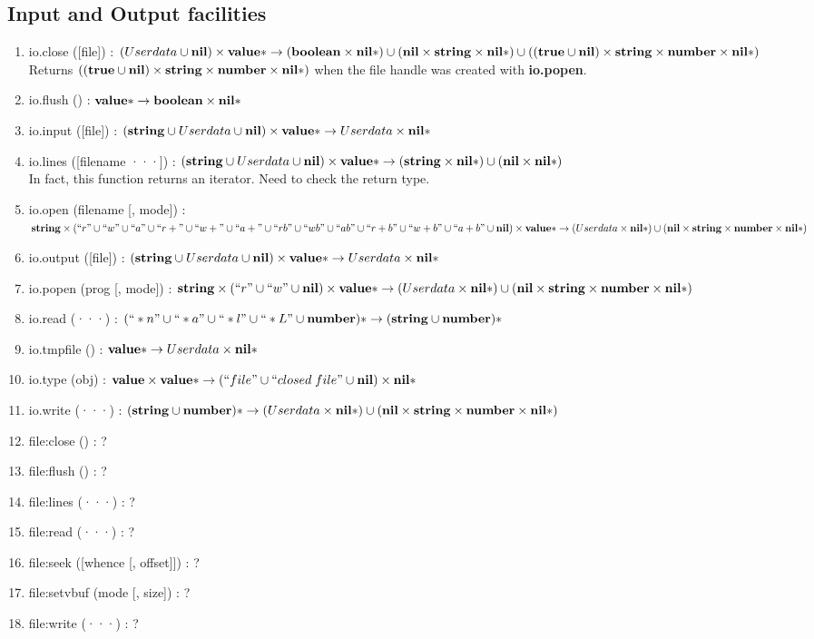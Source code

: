 \subsection{Input and Output facilities}

\begin{enumerate}
\item io.close ([file]) :
$(Userdata \cup \mathbf{nil}) \times
\mathbf{value}{*} \rightarrow
(\mathbf{boolean} \times \mathbf{nil}{*}) \cup
(\mathbf{nil} \times \mathbf{string} \times \mathbf{nil}{*}) \cup
((\mathbf{true} \cup \mathbf{nil}) \times \mathbf{string} \times \mathbf{number} \times \mathbf{nil}{*})$
\\
Returns $((\mathbf{true} \cup \mathbf{nil}) \times \mathbf{string} \times \mathbf{number} \times \mathbf{nil}{*})$
when the file handle was created with \textbf{io.popen}.
\item io.flush () :
$\mathbf{value}{*} \rightarrow \mathbf{boolean} \times \mathbf{nil}{*}$
\item io.input ([file]) :
$(\mathbf{string} \cup Userdata \cup \mathbf{nil}) \times
\mathbf{value}{*} \rightarrow
Userdata \times
\mathbf{nil}{*}$
\item io.lines ([filename ···]) :
$(\mathbf{string} \cup Userdata \cup \mathbf{nil}) \times
\mathbf{value}{*} \rightarrow
(\mathbf{string} \times \mathbf{nil}{*}) \cup
(\mathbf{nil} \times \mathbf{nil}{*})$
\\
In fact, this function returns an iterator. Need to check the return type.
\item io.open (filename [, mode]) :
$\mathbf{string} \times
(``r" \cup ``w" \cup ``a" \cup
``r+" \cup ``w+" \cup ``a+" \cup
``rb" \cup ``wb" \cup ``ab" \cup
``r+b" \cup ``w+b" \cup ``a+b" \cup
\mathbf{nil}) \times
\mathbf{value}{*} \rightarrow
(Userdata \times \mathbf{nil}{*}) \cup
(\mathbf{nil} \times \mathbf{string} \times \mathbf{number} \times \mathbf{nil}{*})$
\item io.output ([file]) :
$(\mathbf{string} \cup Userdata \cup \mathbf{nil}) \times
\mathbf{value}{*} \rightarrow
Userdata \times
\mathbf{nil}{*}$
\item io.popen (prog [, mode]) :
$\mathbf{string} \times
(``r" \cup ``w" \cup \mathbf{nil}) \times
\mathbf{value}{*} \rightarrow
(Userdata \times \mathbf{nil}{*}) \cup
(\mathbf{nil} \times \mathbf{string} \times \mathbf{number} \times \mathbf{nil}{*})$
\item io.read (···) :
$(``*n" \cup ``*a" \cup ``*l" \cup ``*L" \cup \mathbf{number}){*} \rightarrow
(\mathbf{string} \cup \mathbf{number}){*}
$
\item io.tmpfile () :
$\mathbf{value}{*} \rightarrow Userdata \times \mathbf{nil}{*}$
\item io.type (obj) :
$\mathbf{value} \times \mathbf{value}{*} \rightarrow (``file" \cup ``closed\;file" \cup \mathbf{nil}) \times \mathbf{nil}{*}$
\item io.write (···) :
$(\mathbf{string} \cup \mathbf{number}){*} \rightarrow
(Userdata \times \mathbf{nil}{*}) \cup
(\mathbf{nil} \times \mathbf{string} \times \mathbf{number} \times \mathbf{nil}{*})$
\item file:close () : ?
\item file:flush () : ?
\item file:lines (···) : ?
\item file:read (···) : ?
\item file:seek ([whence [, offset]]) : ?
\item file:setvbuf (mode [, size]) : ?
\item file:write (···) : ?
\end{enumerate}

